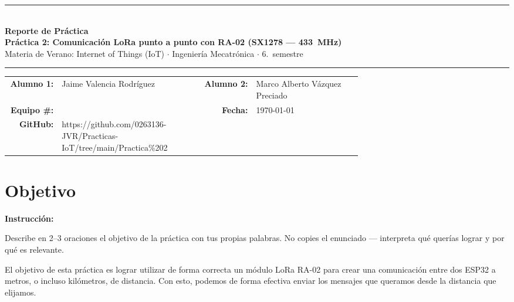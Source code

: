 \documentclass[11pt, letterpaper]{article}
\newenvironment{instruccion}{%
  \begin{mdframed}[backgroundcolor=tealLight, linecolor=tealMain, linewidth=1pt,
    innerleftmargin=10pt, innerrightmargin=10pt,
    innertopmargin=6pt,  innerbottommargin=6pt]
  \small\textbf{\color{tealMain}Instrucci\'on:}\hspace{4pt}
}{\end{mdframed}}
\begin{document}

\begin{center}
  {\color{upBlue}\rule{\linewidth}{1.5pt}}\\[0.3cm]
  {\Large\bfseries\color{upBlue} Reporte de Pr\'actica}\\[0.2cm]
  {\large\bfseries\color{roseMain}
    Pr\'actica 2: Comunicaci\'on LoRa punto a punto con RA-02 (SX1278 --- 433~MHz)}\\[0.15cm]
  {\normalsize Materia de Verano: Internet of Things (IoT)
    $\cdot$ Ingenier\'ia Mecatr\'onica $\cdot$ 6.\textdegree\ semestre}\\[0.3cm]
  {\color{upBlue}\rule{\linewidth}{0.8pt}}
\end{center}

\vspace{0.3cm}

\begin{tabular}{r>{\raggedright\arraybackslash}p{0.4\linewidth}r>{\raggedright\arraybackslash}p{0.3\linewidth}}
  \textbf{Alumno 1:}  & Jaime Valencia Rodríguez&
  \textbf{Alumno 2:}  & Marco Alberto Vázquez Preciado\\[0.5em]
  \textbf{Equipo \#:} & 4&
  \textbf{Fecha:}     & \today        \\[0.5em]
  \textbf{GitHub:}    & https://github.com/0263136-JVR/Practicas-IoT/tree/main/Practica\%202& & \\
\end{tabular}

\vspace{0.4cm}

\section{Objetivo}

\begin{instruccion}
  Describe en 2--3 oraciones el objetivo de la pr\'actica con tus propias palabras.
  No copies el enunciado --- interpreta qu\'e quer\'ias lograr y por qu\'e es relevante.
\end{instruccion}

El objetivo de esta práctica es lograr utilizar de forma correcta un módulo LoRa RA-02 para crear una comunicación entre dos ESP32 a metros, o incluso kilómetros, de distancia. Con esto, podemos de forma efectiva enviar los mensajes que queramos desde la distancia que elijamos.
\end{document}
